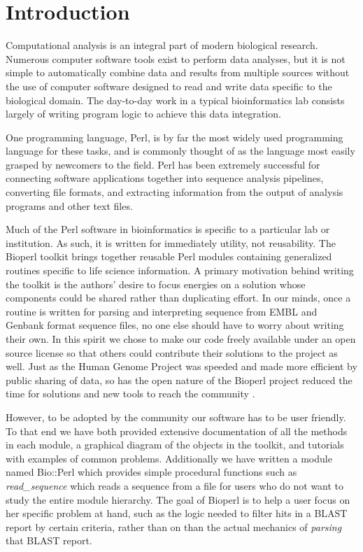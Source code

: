 \documentclass[12pt]{article}
\begin{document}
\section{Introduction}

Computational analysis is an integral part of modern biological
research.  Numerous computer software tools exist to perform data
analyses, but it is not simple to automatically combine data and
results from multiple sources without the use of computer software
designed to read and write data specific to the biological domain.
The day-to-day work in a typical bioinformatics lab consists largely
of writing program logic to achieve this data integration.

One programming language, Perl, is by far the most widely used
programming language for these tasks, and is commonly thought of as
the language most easily grasped by newcomers to the field.  Perl has
been extremely successful for connecting software applications together into
sequence analysis pipelines, converting file formats, and extracting
information from the output of analysis programs and other text files.

Much of the Perl software in bioinformatics is specific to a
particular lab or institution.  As such, it is written for immediately
utility, not reusability.  The Bioperl toolkit brings together
reusable Perl modules containing generalized routines specific to life
science information.  A primary motivation behind writing the toolkit
is the authors' desire to focus energies on a solution whose
components could be shared rather than duplicating effort.  In our
minds, once a routine is written for parsing and interpreting sequence
from EMBL and Genbank format sequence files, no one else should have
to worry about writing their own.  In this spirit we chose to make our
code freely available under an open source license
\cite{open-source-ref} so that others could contribute their solutions
to the project as well.  Just as the Human Genome Project was speeded
and made more efficient by public sharing of data, so has the open
nature of the Bioperl project reduced the time for solutions and new
tools to reach the community \cite{waterston}.

However, to be adopted by the community our software has to be user
friendly.  To that end we have both provided extensive documentation
of all the methods in each module, a graphical diagram of the objects
in the toolkit, and tutorials with examples of common problems.
Additionally we have written a module named Bio::Perl which provides
simple procedural functions such as \textit{read\_sequence} which
reads a sequence from a file for users who do not want to study the
entire module hierarchy.  The goal of Bioperl is to help a user focus
on her specific problem at hand, such as the logic needed to filter
hits in a BLAST \cite{blast} report by certain criteria, rather than
on than the actual mechanics of \textit{parsing} that BLAST report.
\end{document}
